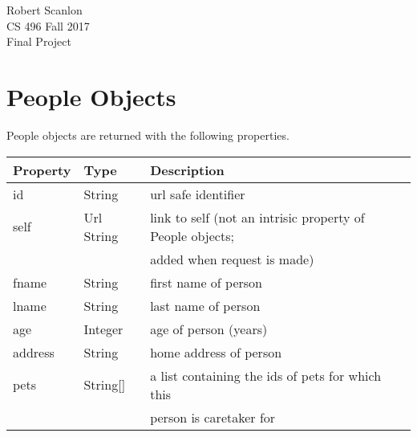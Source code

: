 \documentclass{article}
\begin{document}
\noindent
Robert Scanlon \\
CS 496 Fall 2017 \\
Final Project

\section*{People Objects}
People objects are returned with the following properties. \\
\begin{tabular}{| l | l | l |}
	\hline
	\textbf{Property}     & \textbf{Type}   & \textbf{Description} \\
	\hline
	id                    & String          & url safe identifier \\
	\hline
	self                  & Url String      & link to self (not an intrisic property of People objects; \\
	                      &                 & added when request is made) \\
	\hline
	fname		      & String          & first name of person \\
	\hline
	lname	              & String          & last name of person \\
	\hline
	age	              & Integer         & age of person (years) \\
	\hline
	address               & String          & home address of person \\
	\hline
	pets	              & String[]        & a list containing the ids of pets for which this \\
	                      &                 & person is caretaker for \\
	\hline
\end{tabular}
\end{document}
